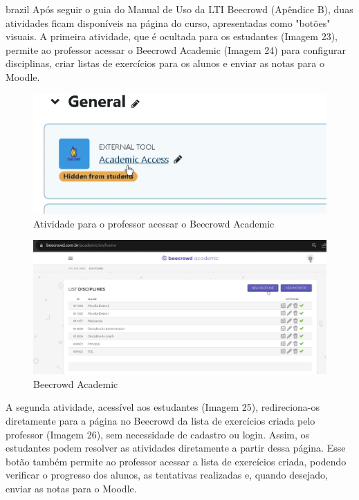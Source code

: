 \begin{otherlanguage*}{brazil}
Após seguir o guia do Manual de Uso da LTI Beecrowd (Apêndice B), duas atividades ficam disponíveis na página do curso, apresentadas como "botões" visuais. A primeira atividade, que é ocultada para os estudantes (Imagem 23), permite ao professor acessar o Beecrowd Academic (Imagem 24) para configurar disciplinas, criar listas de exercícios para os alunos e enviar as notas para o Moodle.

\begin{figure}[H]
    \centering
            \caption{Atividade para o professor acessar o Beecrowd Academic}
            \label{fig:ModeloConceitual}
        \includegraphics[scale=0.35]{pictures/apendices/apendice_b_5.png}
\end{figure}

\begin{figure}[H]
    \centering
            \caption{Beecrowd Academic}
            \label{fig:ModeloConceitual}
        \includegraphics[scale=0.38]{pictures/desenvolvimento/lti_beecrowd_academic.png}
\end{figure}

A segunda atividade, acessível aos estudantes (Imagem 25), redireciona-os diretamente para a página no Beecrowd da lista de exercícios criada pelo professor (Imagem 26), sem necessidade de cadastro ou login. Assim, os estudantes podem resolver as atividades diretamente a partir dessa página. Esse botão também permite ao professor acessar a lista de exercícios criada, podendo verificar o progresso dos alunos, as tentativas realizadas e, quando desejado, enviar as notas para o Moodle.


\end{otherlanguage*}
